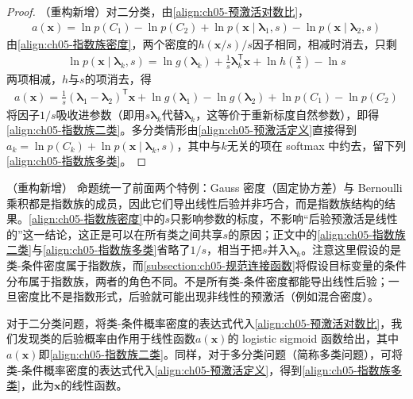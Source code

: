\documentclass[../../main.tex]{subfiles}
\begin{document}
\begin{proof}
（重构新增）对二分类，由\eqref{align:ch05-预激活对数比}，
\begin{align}
  a(\boldsymbol{x})=\ln p(C_1)-\ln p(C_2)+\ln p(\boldsymbol{x}\mid\boldsymbol{\lambda}_1,s)-\ln p(\boldsymbol{x}\mid\boldsymbol{\lambda}_2,s)
\end{align}
由\eqref{align:ch05-指数族密度}，两个密度的$h(\boldsymbol{x}/s)/s$因子相同，相减时消去，只剩
\begin{align}
  \ln p(\boldsymbol{x}\mid\boldsymbol{\lambda}_k,s)=\ln g(\boldsymbol{\lambda}_k)+\frac{1}{s}\boldsymbol{\lambda}_k^{\mathsf{T}}\boldsymbol{x}+\ln h\left(\frac{\boldsymbol{x}}{s}\right)-\ln s
\end{align}
两项相减，$h$与$s$的项消去，得
\begin{align}
  a(\boldsymbol{x})=\frac{1}{s}(\boldsymbol{\lambda}_1-\boldsymbol{\lambda}_2)^{\mathsf{T}}\boldsymbol{x}+\ln g(\boldsymbol{\lambda}_1)-\ln g(\boldsymbol{\lambda}_2)+\ln p(C_1)-\ln p(C_2)
\end{align}
将因子$1/s$吸收进参数（即用$s\boldsymbol{\lambda}_k$代替$\boldsymbol{\lambda}_k$，这等价于重新标度自然参数），即得\eqref{align:ch05-指数族二类}。多分类情形由\eqref{align:ch05-预激活定义}直接得到$a_k=\ln p(C_k)+\ln p(\boldsymbol{x}\mid\boldsymbol{\lambda}_k,s)$，其中与$k$无关的项在 softmax 中约去，留下列\eqref{align:ch05-指数族多类}。
\end{proof}

\begin{remark}（重构新增）
命题统一了前面两个特例：Gauss 密度（固定协方差）与 Bernoulli 乘积都是指数族的成员，因此它们导出线性后验并非巧合，而是指数族结构的结果。\eqref{align:ch05-指数族密度}中的$s$只影响参数的标度，不影响“后验预激活是线性的”这一结论，这正是可以在所有类之间共享$s$的原因；正文中的\eqref{align:ch05-指数族二类}与\eqref{align:ch05-指数族多类}省略了$1/s$，相当于把$s$并入$\boldsymbol{\lambda}_k$。注意这里假设的是类-条件密度属于指数族，而\cref{subsection:ch05-规范连接函数}将假设目标变量的条件分布属于指数族，两者的角色不同。不是所有类-条件密度都能导出线性后验；一旦密度比不是指数形式，后验就可能出现非线性的预激活（例如混合密度）。
\end{remark}

对于二分类问题，将类-条件概率密度的表达式代入\eqref{align:ch05-预激活对数比}，我们发现类的后验概率由作用于线性函数$a(\boldsymbol{x})$的 logistic sigmoid 函数给出，其中$a(\boldsymbol{x})$即\eqref{align:ch05-指数族二类}。同样，对于多分类问题（简称多类问题），可将类-条件概率密度的表达式代入\eqref{align:ch05-预激活定义}，得到\eqref{align:ch05-指数族多类}，此为$\boldsymbol{x}$的线性函数。
\end{document}
